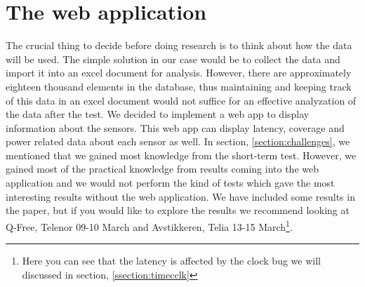 \documentclass[USenglish]{ifimaster}  %
\begin{document}
\begin{table}[H]
\centering
{}
\caption[\textbf{nbiot\_labtest\_details.py} parameters]{\textbf{nbiot\_labtest\_details.py} parameters. See \href{https://github.com/henninghaakonsen/thesis/blob/master/code/nbiot_labtest_details.py}{\acrshort{nb-iot} details}\cite{code:nbiotdetails} for complete code}
\label{table:nbiotdetails}
\end{table}

\chapter{The web application} \label{chapter:webapp}
The crucial thing to decide before doing research is to think about how the data will be used. The simple solution in our case would be to collect the data and import it into an excel document for analysis. However, there are approximately eighteen thousand elements in the database, thus maintaining and keeping track of this data in an excel document would not suffice for an effective analyzation of the data after the test. We decided to implement a web app to display information about the sensors. This web app can display latency, coverage and power related data about each sensor as well. In section, \vref{section:challenges}, we mentioned that we gained most knowledge from the short-term test. However, we gained most of the practical knowledge from results coming into the web application and we would not perform the kind of tests which gave the most interesting results without the web application. We have included some results in the paper, but if you would like to explore the results we recommend looking at Q-Free, Telenor 09-10 March and Avstikkeren, Telia 13-15 March\footnote{Here you can see that the latency is affected by the clock bug we will discussed in section, \vref{ssection:timecclk}}.
\end{document}
